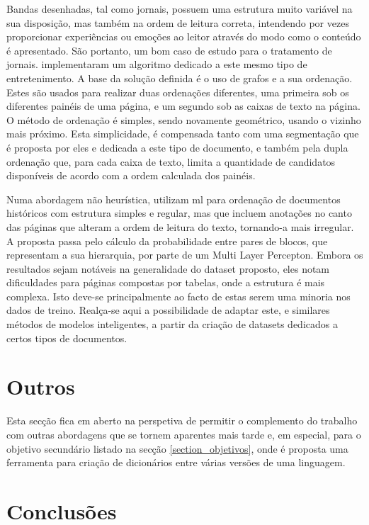 Bandas desenhadas, tal como jornais, possuem uma estrutura muito variável na sua disposição, mas também na ordem de leitura correta, intendendo por vezes proporcionar experiências ou emoções ao leitor através do modo como o conteúdo é apresentado. São portanto, um bom caso de estudo para o tratamento de jornais. \cite{7351614} implementaram um algoritmo dedicado a este mesmo tipo de entretenimento. A base da solução definida é o uso de grafos e a sua ordenação. Estes são usados para realizar duas ordenações diferentes, uma primeira sob os diferentes painéis de uma página, e um segundo sob as caixas de texto na página. O método de ordenação é simples, sendo novamente geométrico, usando o vizinho mais próximo. Esta simplicidade, é compensada tanto com uma segmentação que é proposta por eles e dedicada a este tipo de documento, e também pela dupla ordenação que, para cada caixa de texto, limita a quantidade de candidatos disponíveis de acordo com a ordem calculada dos painéis.

Numa abordagem não heurística, \cite{9413256} utilizam \acrshort{ml} para ordenação de documentos históricos com estrutura simples e regular, mas que incluem anotações no canto das páginas que alteram a ordem de leitura do texto, tornando-a mais irregular. A proposta passa pelo cálculo da probabilidade entre pares de blocos, que representam a sua hierarquia, por parte de um Multi Layer Percepton. Embora os resultados sejam notáveis na generalidade do dataset proposto, eles notam dificuldades para páginas compostas por tabelas, onde a estrutura é mais complexa. Isto deve-se principalmente ao facto de estas serem uma minoria nos dados de treino. Realça-se aqui a possibilidade de adaptar este, e similares métodos de modelos inteligentes, a partir da criação de datasets dedicados a certos tipos de documentos.



\section{Outros}

Esta secção fica em aberto na perspetiva de permitir o complemento do trabalho com outras abordagens que se tornem aparentes mais tarde e, em especial, para o objetivo secundário listado na secção \ref{section_objetivos}, onde é proposta uma ferramenta para criação de dicionários entre várias versões de uma linguagem.


\section{Conclusões}

